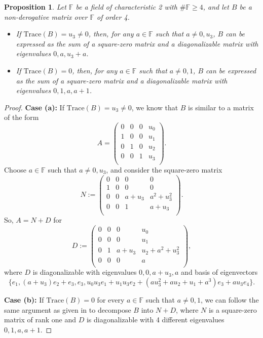 \documentclass{amsart}
\def\FF{\mathbb{F}}
\newtheorem{proposition}[theorem]{Proposition}
\theoremstyle{definition}
\theoremstyle{remark}
\numberwithin{equation}{section}
\begin{document}
\begin{proposition}\label{case4}
Let $\FF$ be a field of characteristic 2 with $\#\FF\ge4$, and let $B$ be a non-derogative matrix over $\FF$ of order 4.
\begin{itemize}
\item[(a)] If $\text{Trace}(B)=u_3\ne 0$, then, for any $a\in\FF$ such that $a\ne 0, u_3$, $B$ can be expressed as the sum of a square-zero matrix and a diagonalizable matrix with eigenvalues $0,a,u_3+a$.
\item[(b)] If $\text{Trace}(B)=0$, then, for any  $a\in \FF$ such that $a\ne 0,1$, $B$ can be expressed as the sum of a square-zero matrix and a diagonalizable matrix with eigenvalues $0,1,a,a+1$.
\end{itemize}
\end{proposition}

\begin{proof}
{\bf Case (a):} If $\text{Trace}(B)=u_3\ne 0$, we know that $B$ is similar to a matrix of the form
$$A=\left(
  \begin{array}{cccc}
    0 & 0 & 0 & u_0 \\
    1 & 0 & 0 & u_1 \\
    0 & 1 & 0 & u_2 \\
   0 & 0 & 1 & u_3 \\
  \end{array}
\right).$$ Choose $a\in\FF$ such that $a\ne 0, u_3$, and consider the square-zero matrix
$$N:=\left(
  \begin{array}{cccc}
    0 & 0 & 0 & 0 \\
    1 & 0 & 0 & 0 \\
    0 & 0 & a+u_3 & a^2+u_3^2 \\
   0 & 0 & 1 & a+u_3 \\
  \end{array}
\right).$$
So, $A=N+D$ for
$$D:= \left(
  \begin{array}{cccc}
    0 & 0 & 0 & u_0 \\
    0 & 0 & 0 & u_1 \\
    0 & 1 & a+u_3 & u_2+a^2+u_3^2 \\
   0 & 0 & 0 & a \\
  \end{array}
\right),$$ where $D$ is diagonalizable with eigenvalues $0,0,a+u_3,a$ and basis of eigenvectors $$\{e_1, (a+u_3) e_2+ e_3, e_3, u_0 u_3 e_1+u_1u_3 e_2+ (au_3^2+au_2+u_1+a^3)e_3+a u_3 e_4\}.$$

{\bf Case (b):} If $\text{Trace}(B)=0$ for every $a \in \FF$ such that $a\ne 0,1$, we can follow the same argument as given in \cite[Lemma 3.1]{DGL1} to decompose $B$ into $N+D$, where $N$ is a square-zero matrix of rank one and $D$ is diagonalizable with 4 different eigenvalues $0,1,a,a+1$.
\end{proof}
\end{document}
